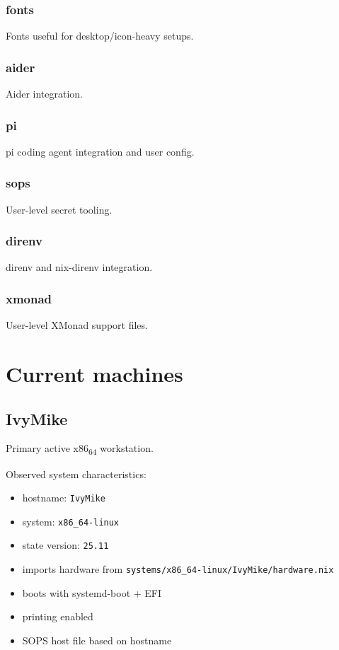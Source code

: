 \documentclass[11pt]{article}
\begin{document}
\subsubsection{fonts}
\label{sec:org11ef962}
Fonts useful for desktop/icon-heavy setups.
\subsubsection{aider}
\label{sec:org8e47a4a}
Aider integration.
\subsubsection{pi}
\label{sec:org99f7751}
pi coding agent integration and user config.
\subsubsection{sops}
\label{sec:org6ad7be3}
User-level secret tooling.
\subsubsection{direnv}
\label{sec:org27cc591}
direnv and nix-direnv integration.
\subsubsection{xmonad}
\label{sec:org8533c2f}
User-level XMonad support files.
\section{Current machines}
\label{sec:org1861ed8}

\subsection{IvyMike}
\label{sec:orga5864a6}
Primary active x86\textsubscript{64} workstation.

Observed system characteristics:
\begin{itemize}
\item hostname: \texttt{IvyMike}
\item system: \texttt{x86\_64-linux}
\item state version: \texttt{25.11}
\item imports hardware from \texttt{systems/x86\_64-linux/IvyMike/hardware.nix}
\item boots with systemd-boot + EFI
\item printing enabled
\item SOPS host file based on hostname
\end{itemize}
\end{document}
